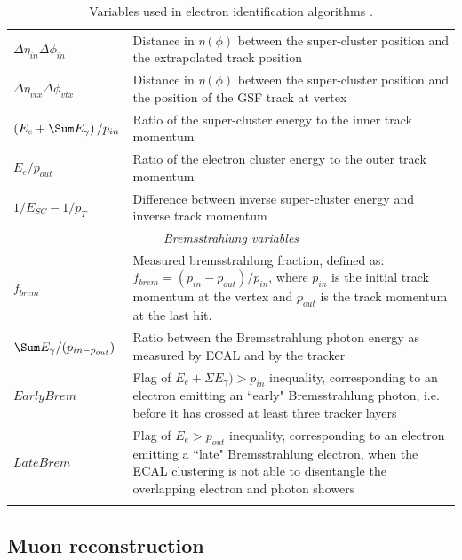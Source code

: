 \begin{center}
\begin{longtable}{|l|p{11cm}|}
\hline	
	$\Delta \eta_{in} \Delta \phi_{in}$ & Distance in $\eta (\phi)$ between the super-cluster position and the extrapolated track position \\
	$\Delta \eta_{vtx} \Delta \phi_{vtx}$ & Distance in $\eta (\phi)$ between the super-cluster position and the position of the GSF track at vertex \\
	$\left( E_{e} + \Sum E_{\gamma} \right)/p_{in}$ & Ratio of the super-cluster energy to the inner track momentum \\
	$E_{e}/p_{out}$ & Ratio of the electron cluster energy to the outer track momentum \\
	$1/E_{SC} - 1/p_T$ & Difference between inverse super-cluster energy and inverse track momentum \\
\hline	
	\multicolumn{2}{|c|}{\emph{Bremsstrahlung variables}} \\
\hline	
	$f_{brem}$ & Measured bremsstrahlung fraction, defined as: $f_{brem} = (p_{in} - p_{out})/p_{in}$, where $p_{in}$ is the initial track momentum at the vertex and $p_{out}$ is the track momentum at the last hit. \\
	$\Sum E_{\gamma}/(p_{in - p_{out}})$ & Ratio between the Bremsstrahlung photon energy as measured by ECAL and by the tracker \\
	$EarlyBrem$ & Flag of $E_{e} + \Sigma E_{\gamma}) > p_{in}$ inequality, corresponding to an electron emitting an ``early" Bremsstrahlung photon, i.e. before it has crossed at least three tracker layers \\
	$LateBrem$ & Flag of $E_e > p_{out}$ inequality, corresponding to an electron emitting a ``late" Bremsstrahlung electron, when the ECAL clustering is not able to disentangle the overlapping electron and photon showers \\
\hline
\caption{Variables used in electron identification algorithms \cite{SergeyThesis}.}
\label{tab-ElectronMVAVariables}
\end{longtable} 
\end{center}

\subsection{Muon reconstruction} \label{subsec-MuonReconstruction}

